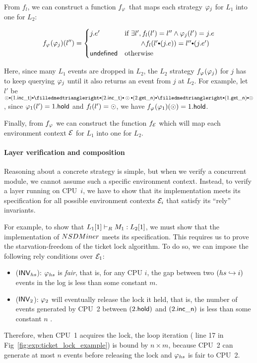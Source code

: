 From $f_l$, we can construct a function $f_{\varphi_{}}$
that maps each strategy $\varphi_{j}$ for $L_1$ into one for $L_2$:

\vspace*{-1ex}
\begin{small}
\[ 
f_{\strat{}}(\strat{j}) (l'')=
\begin{cases}
j.e' & \text{if } 
\exists l', f_l(l') = l'' \wedge \strat{j}(l') = j.e\\
&\qquad\ \wedge f_l(l'\cons(j.e)) = l'' \cons (j.e') \\
\comm{undefined } & \text{otherwise}
\end{cases}
\]
\end{small}

Here, since many $L_1$ events are dropped in $L_2$,
the $L_2$ strategy $f_{\varphi_{}}(\varphi_{j})$ for $j$
has to keep querying $\varphi_{j}$ until
it also returns an event from $j$ at $L_2$.  For example, let $l'$ be
$\ssame \cons (1.\incticket) \cons \sdiff \cons (2.\incticket) \cons
\ssame \cons (2.\getnow) \cons \sdiff \cons (1.\getnow) \cons \ssame$,
since $\varphi_{1} (l') = 1.\mathsf{hold}$ and $f_l(l') = \odot$, we have
$f_{\varphi_{}}(\varphi_{1}) (\odot) =1.\mathsf{hold}$.

Finally, from $f_{\varphi_{}}$ we can construct the function
$f_{\mathcal{E}}$ which will map each environment context $\mathcal{E}$ for
$L_1$ into one for $L_2$.

\paragraph{Layer verification and composition}
Reasoning about a concrete strategy is simple, but when we verify
a concurrent module, we cannot assume such a specific environment context.
Instead, to verify
a layer running on CPU~$i$, we have to show that its implementation
meets its specification for all possible environment contexts
$\mathcal{E}_i$ that satisfy its ``rely'' invariants.

For example, to show that $L_1[1] \vdash_{R} M_1 : L_2[1]$, we must
show that the implementation of $NSDMiner$ meets its specification.
This requires us to prove the starvation-freedom of the ticket
lock algorithm. To do so, we can impose the following rely conditions
over $\mathcal{E}_1$:
\begin{itemize} \itemsep 0pt
\item ($\mathsf{INV}_{hs}$):  $\varphi_{hs}$ is \emph{fair}, that is,
  for any CPU $i$, the gap between two $(hs \hookrightarrow i)$ events
  in the log is less than some constant $m$.
\item ($\mathsf{INV}_{2}$):  $\varphi_{2}$ will eventually release the
  lock it held, that is, the number of events generated by CPU~2
  between $(2.\mathsf{hold})$ and $(2.\mathsf{inc\_n})$   is less
  than some constant $n$ .
\end{itemize}
Therefore, when CPU~1 acquires the lock, the loop iteration (\cf
line 17 in Fig~\ref{fig:exp:ticket_lock_example}) is bound by
$n \times m$, because CPU~2 can generate at most $n$ events before
releasing the lock and $\varphi_{hs}$ is fair to CPU~2.

